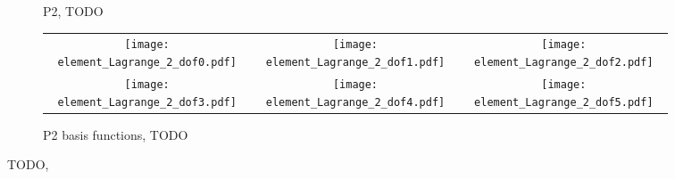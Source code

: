 \documentclass[thesis]{subfiles}
\begin{document}
\begin{figure}
  \begin{subfigure}{.3\textwidth}
    \caption{P2, TODO}
  \end{subfigure}
  \begin{subfigure}{.68\textwidth}
    \begin{tabular}{c c c}
      \texttt{[image: element\_Lagrange\_2\_dof0.pdf]}
      &
      \texttt{[image: element\_Lagrange\_2\_dof1.pdf]}
      &
      \texttt{[image: element\_Lagrange\_2\_dof2.pdf]}
      \\
      \texttt{[image: element\_Lagrange\_2\_dof3.pdf]}
      &
      \texttt{[image: element\_Lagrange\_2\_dof4.pdf]}
      &
      \texttt{[image: element\_Lagrange\_2\_dof5.pdf]}
    \end{tabular}
    \caption{P2 basis functions, TODO}
  \end{subfigure}
  \caption{TODO, \cite{defelement}}
\end{figure}




\end{document}
